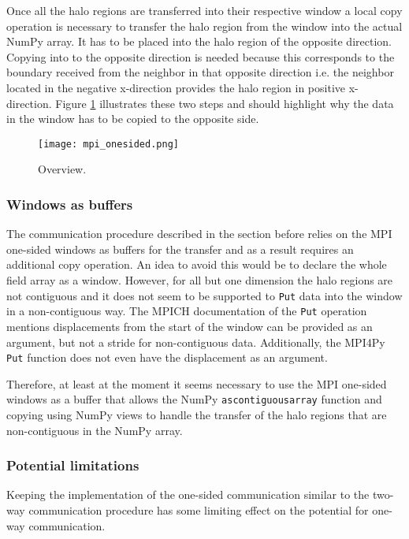 Once all the halo regions are transferred into their respective window a local copy operation is necessary to transfer the halo region from the window into the actual NumPy array.
It has to be placed into the halo region of the opposite direction.
Copying into to the opposite direction is needed because this corresponds to the boundary received from the neighbor in that opposite direction i.e. the neighbor located in the negative x-direction provides the halo region in positive x-direction.
Figure \ref{fig:mpi_onesided_communication_flow} illustrates these two steps and should highlight why the data in the window has to be copied to the opposite side.

\begin{figure}
\centering
\texttt{[image: mpi\_onesided.png]}
\caption{Overview.}
\label{fig:mpi_onesided_communication_flow}
\end{figure}

\subsubsection{Windows as buffers}
The communication procedure described in the section before relies on the MPI one-sided windows as buffers for the transfer and as a result requires an additional copy operation.
An idea to avoid this would be to declare the whole field array as a window.
However, for all but one dimension the halo regions are not contiguous and it does not seem to be supported to \texttt{Put} data into the window in a non-contiguous way.
The MPICH documentation of the \texttt{Put} operation mentions displacements from the start of the window can be provided as an argument, but not a stride for non-contiguous data.
Additionally, the MPI4Py \texttt{Put} function does not even have the displacement as an argument.

Therefore, at least at the moment it seems necessary to use the MPI one-sided windows as a buffer that allows the NumPy \texttt{ascontiguousarray} function and copying using NumPy views to handle the transfer of the halo regions that are non-contiguous in the NumPy array.

\subsubsection{Potential limitations}
Keeping the implementation of the one-sided communication similar to the two-way communication procedure has some limiting effect on the potential for one-way communication.

